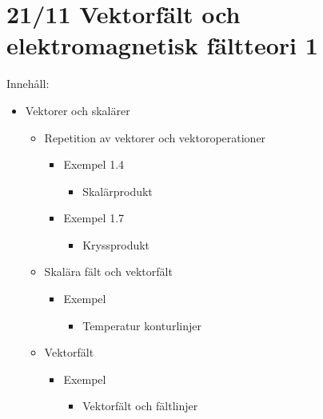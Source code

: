 \section{21/11 \quad Vektorfält och elektromagnetisk fältteori \quad \textcircled{1}}

Innehåll:
\begin{itemize}[label=--]
  \item Vektorer och skalärer
  \begin{itemize}[label=+]
    \item Repetition av vektorer och vektoroperationer
    \begin{itemize}[label=--]
      \item Exempel 1.4
      \begin{itemize}[label=+]
        \item Skalärprodukt
      \end{itemize}
      \item Exempel 1.7
      \begin{itemize}[label=+]
        \item Kryssprodukt
      \end{itemize}
    \end{itemize}
    \item Skalära fält och vektorfält
    \begin{itemize}[label=--]
      \item Exempel
      \begin{itemize}[label=+]
        \item Temperatur konturlinjer
      \end{itemize}
    \end{itemize}
    \item Vektorfält
    \begin{itemize}[label=--]
      \item Exempel
      \begin{itemize}[label=+]
        \item Vektorfält och fältlinjer
      \end{itemize}
    \end{itemize}
  \end{itemize}
\end{itemize}
